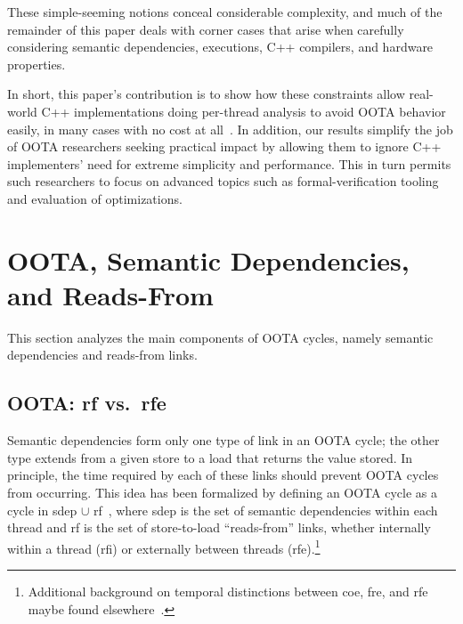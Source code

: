 These simple-seeming notions conceal considerable complexity,
and much of the remainder of this paper deals with corner cases that
arise when carefully considering semantic dependencies, executions, C++
compilers, and hardware properties.

In short, this paper's contribution is to show how these
constraints allow real-world C++ implementations doing per-thread
analysis to avoid OOTA behavior easily,
in many cases with no cost at
all~\cite{PaulEMcKenney2023P3046R2/OOTAwithoutTrying}.
In addition, our results simplify the job of OOTA researchers seeking
practical impact by allowing them to ignore C++ implementers' need for
extreme simplicity and performance.
This in turn permits such researchers to focus on advanced topics such
as formal-verification tooling and evaluation of optimizations.

\section{OOTA, Semantic Dependencies, and Reads-From}
\label{sec:OOTA, Semantic Dependencies, and Reads-From}

This section analyzes the main components of OOTA cycles, namely
semantic dependencies and reads-from links.

\subsection{OOTA: rf vs.\ rfe}
\label{sec:OOTA: rf vs. rfe}

Semantic dependencies form only one type of link in an OOTA cycle;
the other type extends from a given store to a load that returns the
value stored.
In principle, the time required by each of these links should prevent
OOTA cycles from occurring.
This idea has been formalized by defining an OOTA cycle as a cycle
in sdep $\cup$ rf~\cite{PaulEMcKenney2014OOTA},
where sdep is the set of semantic dependencies within each thread and
rf is the set of store-to-load ``reads-from'' links, whether internally
within a thread (rfi) or externally between threads (rfe).\footnote{
	Additional background on temporal distinctions between coe, fre,
	and rfe maybe found elsewhere~\cite[Appendix A]{PaulEMcKenney2023P3046R2/OOTAwithoutTrying}.}

